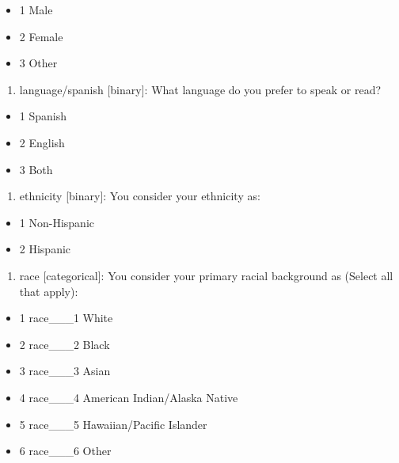 \documentclass[
  letterpaper,
  DIV=11,
  numbers=noendperiod]{scrreprt}
\providecommand{\tightlist}{%
  \setlength{\itemsep}{0pt}\setlength{\parskip}{0pt}}\usepackage{longtable,booktabs,array}
\begin{document}
\begin{itemize}
\tightlist
\item
  1 Male
\item
  2 Female
\item
  3 Other
\end{itemize}

\begin{enumerate}
\def\labelenumi{\arabic{enumi}.}
\setcounter{enumi}{4}
\tightlist
\item
  language/spanish {[}binary{]}: What language do you prefer to speak or
  read?
\end{enumerate}

\begin{itemize}
\tightlist
\item
  1 Spanish
\item
  2 English
\item
  3 Both
\end{itemize}

\begin{enumerate}
\def\labelenumi{\arabic{enumi}.}
\setcounter{enumi}{5}
\tightlist
\item
  ethnicity {[}binary{]}: You consider your ethnicity as:
\end{enumerate}

\begin{itemize}
\tightlist
\item
  1 Non-Hispanic
\item
  2 Hispanic
\end{itemize}

\begin{enumerate}
\def\labelenumi{\arabic{enumi}.}
\setcounter{enumi}{6}
\tightlist
\item
  race {[}categorical{]}: You consider your primary racial background as
  (Select all that apply):
\end{enumerate}

\begin{itemize}
\tightlist
\item
  1 race\_\_\_1 White
\item
  2 race\_\_\_2 Black
\item
  3 race\_\_\_3 Asian
\item
  4 race\_\_\_4 American Indian/Alaska Native
\item
  5 race\_\_\_5 Hawaiian/Pacific Islander
\item
  6 race\_\_\_6 Other
\end{itemize}
\end{document}
